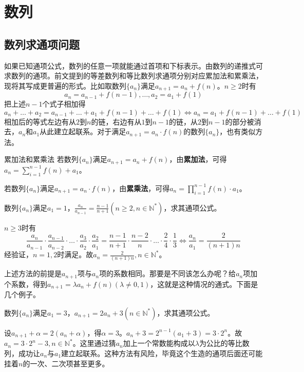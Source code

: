 \documentclass[../sample]{subfiles}
\begin{document}
\chapter{数列}
\section{数列求通项问题}
如果已知通项公式，数列的任意一项就能通过首项和下标表示。由数列的递推式可求数列的通项。前文提到的等差数列和等比数列求通项分别对应累加法和累乘法，现将其写成更普遍的形式。比如取数列$\{a_n\}$满足$a_{n+1}=a_{n}+f(n)$。$n\geq 2$时有\[a_{n}=a_{n-1}+f(n-1), \dots, a_{2}=a_{1}+f(1)\]
把上述$n-1$个式子相加得\[a_{n}+\dots+a_{2}=a_{n-1}+\dots+a_{1}+f(n-1)+\dots+f(1)\Leftrightarrow a_{n}=a_{1}+f(n-1)+\dots+f(1)\]
相加后的等式左边有从$2$到$n$的链，右边有从$1$到$n-1$的链，从$2$到$n-1$的部分被消去，$a_n$和$a_1$从此建立起联系。对于满足$a_{n+1}=a_{n}·f(n)$的数列$\{a_n\}$，也有类似方法。

\begin{theorem}{累加法和累乘法}
  若数列$\{a_n\}$满足$a_{n+1}=a_{n}+f(n)$，由\textbf{累加法}，可得$a_{n}=\sum_{i=1}^{n-1}f(n)+a_1$。
  
  若数列$\{a_n\}$满足$a_{n+1}=a_{n}·f(n)$，由\textbf{累乘法}，可得$a_{n}=\prod_{i=1}^{n-1}f(n)·a_1$。
\end{theorem}

\begin{problem}
  数列$\{a_n\}$满足$a_1=1$，$\frac{a_n}{a_{n-1}}=\frac{n-1}{n+1}(n\geq 2, n\in\mathbb{N^*})$，求其通项公式。
\end{problem}

$n\geq 3$时有\[\frac{a_n}{a_{n-1}}·\frac{a_{n-1}}{a_{n-2}}·\dots·\frac{a_3}{a_2}·\frac{a_2}{a_{1}}=\frac{n-1}{n+1}·\frac{n-2}{n}·\dots·\frac{2}{4}·\frac{1}{3}\Leftrightarrow \frac{a_n}{a_{1}}=\frac{2}{(n+1)n}\]
经验证，$n=1,2$时满足。故$a_n=\frac{2}{(n+1)n},n\in\mathbb{N^*}$。

上述方法的前提是$a_{n+1}$项与$a_n$项的系数相同。那要是不同该怎么办呢？给$a_n$项加个系数，得到$a_{n+1}=\lambda a_{n}+f(n)(\lambda\neq 0, 1)$，这就是这种情况的通式。下面是几个例子。

\begin{problem}
  数列$\{a_n\}$满足$a_1=3$，$a_{n+1}=2a_{n}+3(n\in\mathbb{N^*})$，求其通项公式。
\end{problem}

设$a_{n+1}+\alpha=2(a_n+\alpha)$，得$\alpha=3$。$a_n+3=2^{n-1}(a_1+3)=3·2^n$。故$a_n=3·2^n-3, n\in\mathbb{N^*}$。这里通过猜$a_n$加上一个常数能构成以$\lambda$为公比的等比数列，成功让$a_n$与$a_1$建立起联系。这种方法有风险，毕竟这个生造的通项后面还可能挂着$n$的一次、二次项甚至更多。
\end{document}
